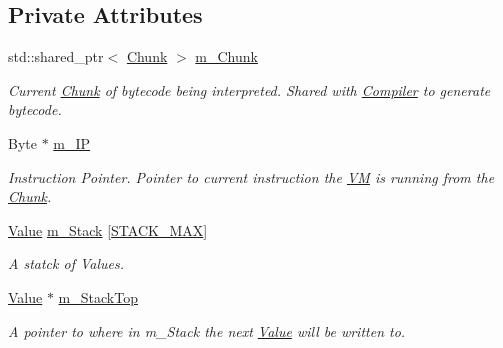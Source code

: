 \subsection*{Private Attributes}
\begin{DoxyCompactItemize}
\item 
\mbox{\label{class_v_m_afd6bec213abad1ab68fe0d0843a7c8df}} 
std\+::shared\+\_\+ptr$<$ \hyperlink{class_chunk}{Chunk} $>$ \hyperlink{class_v_m_afd6bec213abad1ab68fe0d0843a7c8df}{m\+\_\+\+Chunk}
\begin{DoxyCompactList}\small\item\em Current \hyperlink{class_chunk}{Chunk} of bytecode being interpreted. Shared with \hyperlink{class_compiler}{Compiler} to generate bytecode. \end{DoxyCompactList}\item 
\mbox{\label{class_v_m_a803778e52118446bbd0feda7d46b57a2}} 
Byte $\ast$ \hyperlink{class_v_m_a803778e52118446bbd0feda7d46b57a2}{m\+\_\+\+IP}
\begin{DoxyCompactList}\small\item\em Instruction Pointer. Pointer to current instruction the \hyperlink{class_v_m}{VM} is running from the \hyperlink{class_chunk}{Chunk}. \end{DoxyCompactList}\item 
\mbox{\label{class_v_m_a12c199afd5cf2edd7246085d032b9cf6}} 
\hyperlink{class_value}{Value} \hyperlink{class_v_m_a12c199afd5cf2edd7246085d032b9cf6}{m\+\_\+\+Stack} \mbox{[}\hyperlink{_v_m_8h_a27b296fccb4da1e9cfcf1f9c810e619e}{S\+T\+A\+C\+K\+\_\+\+M\+AX}\mbox{]}
\begin{DoxyCompactList}\small\item\em A statck of Values. \end{DoxyCompactList}\item 
\mbox{\label{class_v_m_ad587fad93ffbdabd57d468b306fc74e7}} 
\hyperlink{class_value}{Value} $\ast$ \hyperlink{class_v_m_ad587fad93ffbdabd57d468b306fc74e7}{m\+\_\+\+Stack\+Top}
\begin{DoxyCompactList}\small\item\em A pointer to where in m\+\_\+\+Stack the next \hyperlink{class_value}{Value} will be written to. \end{DoxyCompactList}\end{DoxyCompactItemize}


